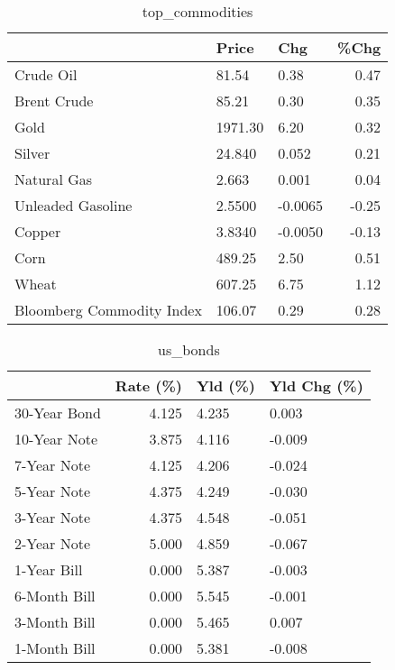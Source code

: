 \documentclass{article}%
\begin{document}
\begin{table}[htbp]%
\caption{top\_commodities}%
\centering%
\begin{adjustbox}{width=1\textwidth}%
\begin{tabular}{lllr}
\toprule
                          &   Price &     Chg &  \%Chg \\
\midrule
               Crude Oil  &   81.54 &    0.38 &  0.47 \\
             Brent Crude  &   85.21 &    0.30 &  0.35 \\
                    Gold  & 1971.30 &    6.20 &  0.32 \\
                  Silver  &  24.840 &   0.052 &  0.21 \\
             Natural Gas  &   2.663 &   0.001 &  0.04 \\
       Unleaded Gasoline  &  2.5500 & -0.0065 & -0.25 \\
                  Copper  &  3.8340 & -0.0050 & -0.13 \\
                    Corn  &  489.25 &    2.50 &  0.51 \\
                   Wheat  &  607.25 &    6.75 &  1.12 \\
Bloomberg Commodity Index &  106.07 &    0.29 &  0.28 \\
\bottomrule
\end{tabular}
%
\end{adjustbox}%
\end{table}

%


\begin{table}[htbp]%
\caption{us\_bonds}%
\centering%
\begin{adjustbox}{width=1\textwidth}%
\begin{tabular}{lrll}
\toprule
             &  Rate (\%) & Yld (\%) & Yld Chg (\%) \\
\midrule
30-Year Bond &     4.125 &   4.235 &       0.003 \\
10-Year Note &     3.875 &   4.116 &      -0.009 \\
 7-Year Note &     4.125 &   4.206 &      -0.024 \\
 5-Year Note &     4.375 &   4.249 &      -0.030 \\
 3-Year Note &     4.375 &   4.548 &      -0.051 \\
 2-Year Note &     5.000 &   4.859 &      -0.067 \\
 1-Year Bill &     0.000 &   5.387 &      -0.003 \\
6-Month Bill &     0.000 &   5.545 &      -0.001 \\
3-Month Bill &     0.000 &   5.465 &       0.007 \\
1-Month Bill &     0.000 &   5.381 &      -0.008 \\
\bottomrule
\end{tabular}
%
\end{adjustbox}%
\end{table}
\end{document}
